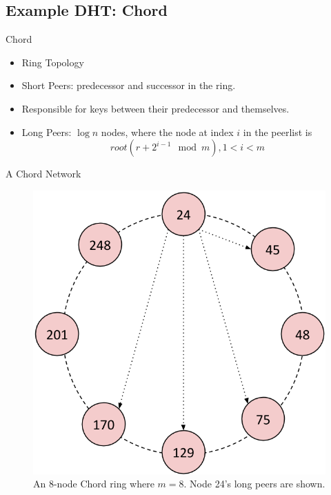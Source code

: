 \documentclass[11pt]{beamer}
\begin{document}
\subsection{Example DHT: Chord}

\begin{frame}{Chord}
	\begin{itemize}
		\item Ring Topology
		\item Short Peers: predecessor and successor in the ring.
		\item Responsible for keys between their predecessor and themselves.
		\item Long Peers:  $\log n$ nodes, where the node at index $i$ in the  peerlist is 
		$$ root(r + 2^{i-1} \mod  m) ,  1 < i  < m $$
		
		
		
	\end{itemize}
\end{frame}


\begin{frame}{A Chord Network}
	\begin{figure}
		\includegraphics[width=0.55\linewidth]{figs/CR_overlay}
		\caption{An 8-node Chord ring where $m=8$.  Node 24's long peers are shown.}
		\label{fig:chordreal}
	\end{figure}
\end{frame}
\end{document}
